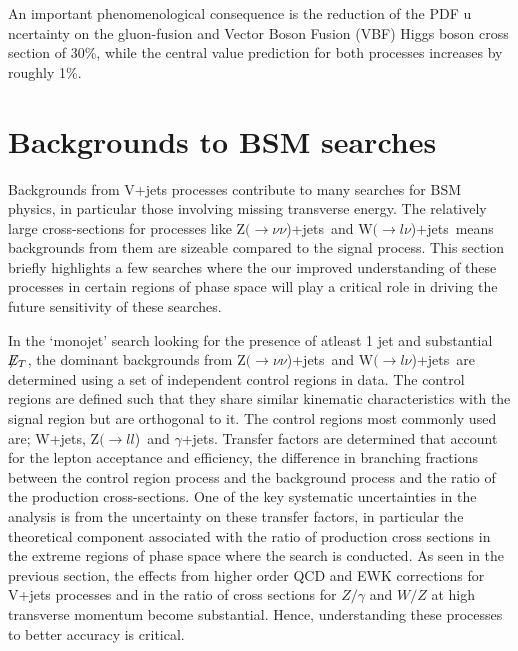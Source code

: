 \documentclass[a4paper,11pt,notoc]{article}
\newcommand{\Zll}   {\mbox{${\mathrm Z}(\rightarrow l l$)}}
\newcommand{\Znunuj}   {\mbox{${\mathrm Z}(\rightarrow\nu \nu$)+jets}}
\newcommand{\Wlnuj}   {\mbox{${\mathrm W}(\rightarrow l\nu$)+jets}}
\newcommand{\met}{\ensuremath{\not\!\!E_T}}
\begin{document}
%
An important phenomenological consequence is the reduction of the PDF u
ncertainty on the  gluon-fusion  and Vector Boson 
Fusion (VBF) Higgs boson cross section of 30\%, while the central value 
prediction for both processes increases by roughly 1\%.

\section{Backgrounds to BSM searches}
Backgrounds from V+jets processes contribute to many searches for BSM physics, in particular those involving missing transverse energy. The relatively large cross-sections for processes like \Znunuj\ and \Wlnuj\ means backgrounds from them are sizeable compared to the signal process. This section briefly highlights a few searches where the our improved understanding of these processes in certain regions of phase space will play a critical role in driving the future sensitivity of these searches. 

In the `monojet' search looking for the presence of atleast 1 jet and substantial \met, the dominant backgrounds from \Znunuj\ and \Wlnuj\ are determined using a set of independent control regions in data. The control regions are defined such that they share similar kinematic characteristics with the signal region but are orthogonal to it. The control regions most commonly used are; W+jets, \Zll\ and $\gamma$+jets. Transfer factors are determined that account for the lepton acceptance and efficiency, the difference in branching fractions between the control region process and the background process and the ratio of the production cross-sections. One of the key systematic uncertainties in the analysis is from the uncertainty on these transfer factors, in particular the theoretical component associated with the ratio of production cross sections in the extreme regions of phase space where the search is conducted. As seen in the previous section, the effects from higher order QCD and EWK corrections for V+jets processes and in the ratio of cross sections for $Z/\gamma$ and $W/Z$ at high transverse momentum become substantial. Hence, understanding these processes to better accuracy is critical.
\end{document}
